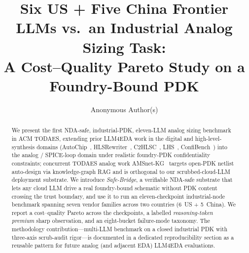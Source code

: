 \documentclass[acmsmall,review,anonymous]{acmart}
\title{Six US + Five China Frontier LLMs vs.\ an Industrial Analog Sizing Task:\\
A Cost--Quality Pareto Study on a Foundry-Bound PDK}
\author{Anonymous Author(s)}
\affiliation{%
  \institution{Submission \#TBD}
  \city{}\country{}}
\begin{document}
\begin{abstract}
We present the first NDA-safe, industrial-PDK, eleven-LLM analog
sizing benchmark in ACM TODAES, extending prior LLM4EDA work in the
digital and high-level-synthesis domains (AutoChip~\cite{autochip},
HLSRewriter~\cite{hlsrewriter}, C2HLSC~\cite{c2hlsc},
LHS~\cite{lhs}, ConfiBench~\cite{confibench}) into the analog /
SPICE-loop domain under realistic foundry-PDK confidentiality
constraints; concurrent TODAES analog work
AMSnet-KG~\cite{amsnetkg} targets open-PDK netlist auto-design via
knowledge-graph RAG and is orthogonal to our scrubbed-cloud-LLM
deployment substrate. We introduce \emph{Safe-Bridge}, a
verifiable NDA-safe substrate that lets any cloud LLM drive a real
foundry-bound schematic without PDK content crossing the trust
boundary, and use it to run an eleven-checkpoint industrial-node
benchmark spanning seven vendor families across two countries
(6~US + 5~China). We report a cost--quality Pareto across the
checkpoints, a labelled \emph{reasoning-token premium} sharp
observation, and an eight-bucket failure-mode taxonomy. The
methodology contribution---multi-LLM benchmark on a closed
industrial PDK with three-axis scrub-audit rigor---is documented
in a dedicated reproducibility section as a reusable pattern for
future analog (and adjacent EDA) LLM4EDA evaluations.
\end{abstract}


\maketitle












\end{document}
